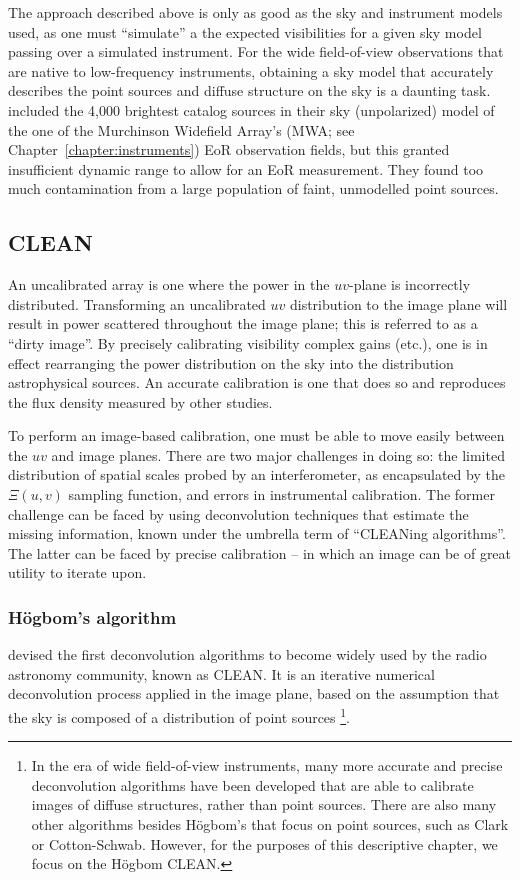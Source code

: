 The approach described above is only as good as the sky and instrument models used, as one must ``simulate'' a the expected visibilities for a given sky model passing over a simulated instrument. For the wide field-of-view observations that are native to low-frequency instruments, obtaining a sky model that accurately describes the point sources and diffuse structure on the sky is a daunting task. \cite{Barry.16} included the 4,000 brightest catalog sources in their sky (unpolarized) model of the one of the Murchinson Widefield Array's (MWA; see Chapter~\ref{chapter:instruments}) EoR observation fields, but this granted insufficient dynamic range to allow for an EoR measurement. They found too much contamination from a large population of faint, unmodelled point sources.

\subsection{CLEAN}

An uncalibrated array is one where the power in the $uv$-plane is incorrectly distributed. Transforming an uncalibrated $uv$ distribution to the image plane will result in power scattered throughout the image plane; this is referred to as a ``dirty image''. By precisely calibrating visibility complex gains (etc.), one is in effect rearranging the power distribution on the sky into the distribution astrophysical sources. An accurate calibration is one that does so and reproduces the flux density measured by other studies.

To perform an image-based calibration, one must be able to move easily between the $uv$ and image planes. There are two major challenges in doing so: the limited distribution of spatial scales probed by an interferometer, as encapsulated by the $\Xi(u,v)$ sampling function, and errors in instrumental calibration. The former challenge can be faced by using deconvolution techniques that estimate the missing information, known under the umbrella term of ``CLEANing algorithms''. The latter can be faced by precise calibration -- in which an image can be of great utility to iterate upon. 

\subsubsection{H{\"o}gbom's algorithm}

\cite{Hogbom.74} devised the first deconvolution algorithms to become widely used by the radio astronomy community, known as CLEAN. It is an iterative numerical deconvolution process applied in the image plane, based on the assumption that the sky is composed of a distribution of point sources
\footnote{In the era of wide field-of-view instruments, many more accurate and precise deconvolution algorithms have been developed that are able to calibrate images of diffuse structures, rather than point sources. There are also many other algorithms besides H{\"o}gbom's that focus on point sources, such as Clark or Cotton-Schwab. However, for the purposes of this descriptive chapter, we focus on the H{\"o}gbom CLEAN.}.

